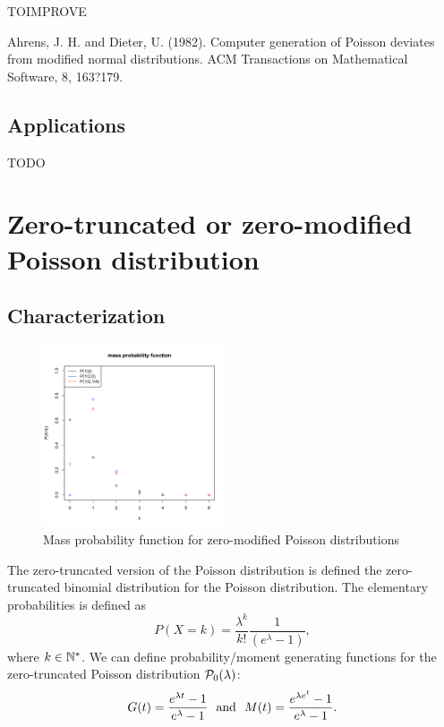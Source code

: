  

TOIMPROVE

Ahrens, J. H. and Dieter, U. (1982). Computer generation of Poisson deviates from modified normal distributions. ACM Transactions on Mathematical Software, 8, 163?179.

\subsection{Applications}
TODO


\section{Zero-truncated or zero-modified Poisson distribution}
\subsection{Characterization}
\begin{figure}
  \vspace{-20pt}
  \begin{center}
    \includegraphics[width=0.48\textwidth]{img/truncpoissonzoom}
  \end{center}
  \vspace{-20pt}
  \caption{Mass probability function for zero-modified Poisson distributions}
  \vspace{-20pt}
\end{figure}

The zero-truncated version of the Poisson distribution is defined the zero-truncated binomial distribution for the Poisson distribution. The elementary probabilities is defined as
$$
P(X=k)=\frac{\lambda^k}{k!}\frac{1}{(e^\lambda-1)},
$$
where $k\in \mathbb N^*$.
We can define probability/moment generating functions for the zero-truncated Poisson distribution $\mathcal P_0(\lambda)$:
$$
G(t) = \frac{e^{\lambda t}-1}{e^\lambda-1} \textrm{~~and~~} M(t) =\frac{e^{\lambda e^t}-1}{e^\lambda-1}.
$$

